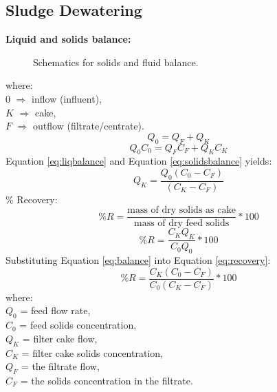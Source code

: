 \documentclass[a4paper, landscape, 8pt]{extarticle}
\begin{document}
\begin{multicols}{4}
\section*{Sludge Dewatering}
\textbf{Liquid and solids balance:}
\begin{figure}[H]
    \centering
    \caption{Schematics for solids and fluid balance.}
    \label{fig:balance}
\end{figure}
where:\\
$0$ $\Rightarrow$ inflow (influent),\\
$K$ $\Rightarrow$ cake,\\
$F$ $\Rightarrow$ outflow (filtrate/centrate).
\begin{equation}
    Q_0 = Q_F + Q_K
    \label{eq:liqbalance}
\end{equation}
\begin{equation}
    Q_0C_0 = Q_FC_F + Q_KC_K
    \label{eq:solidsbalance}
\end{equation}
Equation \ref{eq:liqbalance} and Equation \ref{eq:solidsbalance} yields:
\begin{equation}
    Q_K=\frac{Q_0(C_0-C_F)}{(C_K-C_F)}
    \label{eq:balance}
\end{equation}
\% Recovery:
\[
\%R =\frac{\text{mass of dry solids as cake}}{\text{mass of dry feed solids}}*100
\]
\begin{equation}
    \%R =\frac{C_KQ_K}{C_0Q_0}*100
    \label{eq:recovery}
\end{equation}
Substituting Equation \ref{eq:balance} into Equation \ref{eq:recovery}:
\[
\%R =\frac{C_K(C_0-C_F)}{C_0(C_K-C_F)}*100
\]
where:\\
$Q_0$ = feed flow rate,\\
$C_0$ = feed solids concentration,\\
$Q_K$ = filter cake flow,\\
$C_K$ = filter cake solids concentration,\\
$Q_F$ = the filtrate flow,\\
$C_F$ = the solids concentration in the filtrate.

\end{multicols}
\end{document}
